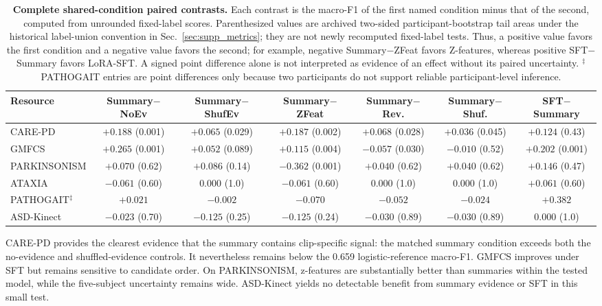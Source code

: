 \begin{table}[H]
\centering
\caption{\textbf{Complete shared-condition paired contrasts.}
Each contrast is the macro-F1 of the first named condition minus that
of the second, computed from unrounded fixed-label scores. Parenthesized values are archived two-sided participant-bootstrap tail areas under the historical label-union convention in Sec.~\ref{sec:supp_metrics}; they are not newly recomputed fixed-label tests. Thus, a positive value favors the first
condition and a negative value favors the second; for example,
negative Summary$-$ZFeat favors Z-features, whereas positive
SFT$-$Summary favors LoRA-SFT. A signed point difference alone is not
interpreted as evidence of an effect without its paired uncertainty.
$^{\ddagger}$PATHOGAIT entries are point differences only because two
participants do not support reliable participant-level inference.}
\label{tab:standardized_full_contrasts}
\scriptsize
\setlength{\tabcolsep}{3pt}
\begin{adjustbox}{max width=\textwidth}
\begin{tabular}{lcccccc}
\toprule
Resource & Summary$-$NoEv & Summary$-$ShufEv & Summary$-$ZFeat & Summary$-$Rev. & Summary$-$Shuf. & SFT$-$Summary \\
\midrule
CARE-PD & $+0.188$ (0.001) & $+0.065$ (0.029) & $+0.187$ (0.002) & $+0.068$ (0.028) & $+0.036$ (0.045) & $+0.124$ (0.43) \\
GMFCS & $+0.265$ (0.001) & $+0.052$ (0.089) & $+0.115$ (0.004) & $-0.057$ (0.030) & $-0.010$ (0.52) & $+0.202$ (0.001) \\
PARKINSONISM & $+0.070$ (0.62) & $+0.086$ (0.14) & $-0.362$ (0.001) & $+0.040$ (0.62) & $+0.040$ (0.62) & $+0.146$ (0.47) \\
ATAXIA & $-0.061$ (0.60) & $0.000$ (1.0) & $-0.061$ (0.60) & $0.000$ (1.0) & $0.000$ (1.0) & $+0.061$ (0.60) \\
PATHOGAIT$^{\ddagger}$ & $+0.021$ & $-0.002$ & $-0.070$ & $-0.052$ & $-0.024$ & $+0.382$ \\
ASD-Kinect & $-0.023$ (0.70) & $-0.125$ (0.25) & $-0.125$ (0.24) & $-0.030$ (0.89) & $-0.030$ (0.89) & $0.000$ (1.0) \\
\bottomrule
\end{tabular}
\end{adjustbox}
\end{table}

CARE-PD provides the clearest evidence that the summary contains clip-specific signal: the matched summary condition exceeds both the no-evidence and shuffled-evidence controls. It nevertheless remains below the 0.659 logistic-reference macro-F1. GMFCS improves under SFT but remains sensitive to candidate order. On PARKINSONISM, z-features are substantially better than summaries within the tested model, while the five-subject uncertainty remains wide. ASD-Kinect yields no detectable benefit from summary evidence or SFT in this small test.

